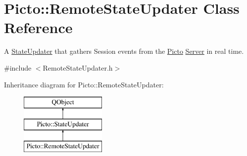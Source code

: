 \hypertarget{class_picto_1_1_remote_state_updater}{\section{Picto\-:\-:Remote\-State\-Updater Class Reference}
\label{class_picto_1_1_remote_state_updater}
}


A \hyperlink{class_picto_1_1_state_updater}{State\-Updater} that gathers Session events from the \hyperlink{namespace_picto}{Picto} \hyperlink{class_server}{Server} in real time.  




{\ttfamily \#include $<$Remote\-State\-Updater.\-h$>$}

Inheritance diagram for Picto\-:\-:Remote\-State\-Updater\-:\begin{figure}[H]
\begin{center}
\leavevmode
\includegraphics[height=3.000000cm]{class_picto_1_1_remote_state_updater}
\end{center}
\end{figure}
